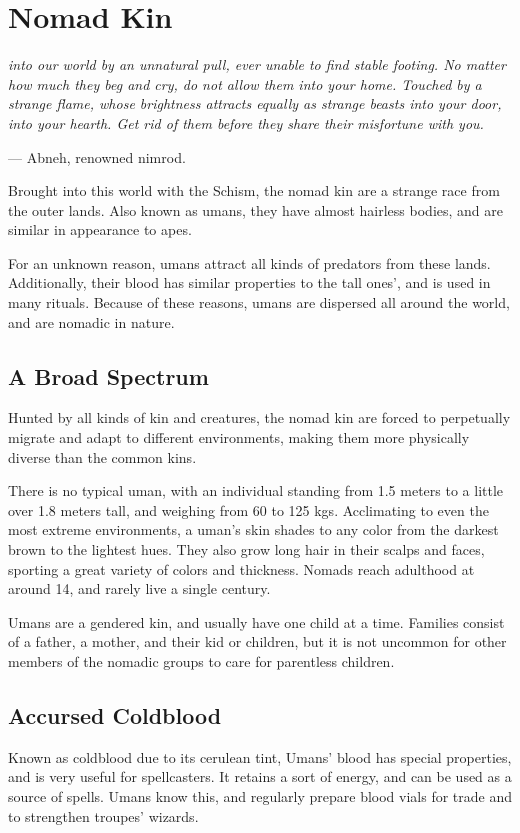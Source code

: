 \section{Nomad Kin} \label{sec::nomadkin}

\textit{into our world by an unnatural pull, ever unable to find stable footing.
No matter how much they beg and cry, do not allow them into your home.
Touched by a strange flame, whose brightness attracts equally as strange beasts into your door, into your hearth.
Get rid of them before they share their misfortune with you.}

\hspace*{\fill} --- Abneh, renowned nimrod.

Brought into this world with the Schism, the nomad kin are a strange race from the outer lands.
Also known as umans, they have almost hairless bodies, and are similar in appearance to apes.

For an unknown reason, umans attract all kinds of predators from these lands.
Additionally, their blood has similar properties to the tall ones', and is used in many rituals.
Because of these reasons, umans are dispersed all around the world, and are nomadic in nature.

\subsection*{A Broad Spectrum}
Hunted by all kinds of kin and creatures, the nomad kin are forced to perpetually migrate and adapt to different environments, making them more physically diverse than the common kins.

There is no typical uman, with an individual standing from 1.5 meters to a little over 1.8 meters tall, and weighing from 60 to 125 kgs.
Acclimating to even the most extreme environments, a uman's skin shades to any color from the darkest brown to the lightest hues.
They also grow long hair in their scalps and faces, sporting a great variety of colors and thickness.
Nomads reach adulthood at around 14, and rarely live a single century.

Umans are a gendered kin, and usually have one child at a time.
Families consist of a father, a mother, and their kid or children, but it is not uncommon for other members of the nomadic groups to care for parentless children.

\subsection*{Accursed Coldblood}
Known as coldblood due to its cerulean tint, Umans' blood has special properties, and is very useful for spellcasters.
It retains a sort of energy, and can be used as a source of spells.
Umans know this, and regularly prepare blood vials for trade and to strengthen troupes' wizards.

